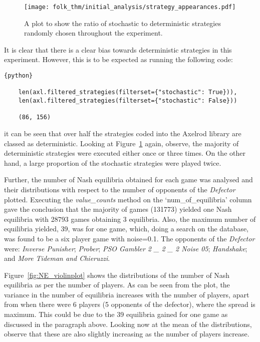 \begin{figure}
    \centering
    \texttt{[image: folk\_thm/initial\_analysis/strategy\_appearances.pdf]}
    \caption{A plot to show the ratio of stochastic to deterministic strategies randomly chosen throughout the experiment.}\label{fig:stochastic_chart}
\end{figure}

It is clear that there is a clear bias towards deterministic strategies
in this experiment. However, this is to be expected as running the following
code:
\begin{verbatim}{python}
    
    len(axl.filtered_strategies(filterset={"stochastic": True})), 
    len(axl.filtered_strategies(filterset={"stochastic": False}))

    (86, 156)
\end{verbatim}
it can be seen that over half the strategies coded into the Axelrod library are
classed as deterministic. Looking at Figure~\ref{fig:stochastic_chart} again,
observe, the majority of deterministic strategies were executed either once or
three times. On the other hand, a large proportion of the stochastic strategies
were played twice.

Further, the number of Nash equilibria obtained for each game was analysed and
their distributions with respect to the number of opponents of the
\textit{Defector} plotted. Executing the \textit{value_counts} method on the
`num_of_equilibria' column gave the conclusion that the majority of games
(131773) yielded one Nash equilibria with 28793 games obtaining 3 equilibria.
Also, the maximum number of equilibria yielded, 39, was for one game, which,
doing a search on the database, was found to be a six player game with
noise=0.1. The opponents of the \textit{Defector} were: \textit{Inverse
Punisher}; \textit{Prober}; \textit{PSO Gambler 2 _ 2 _ 2 Noise 05};
\textit{Handshake}; and \textit{More Tideman and Chieruzzi}.

Figure~\ref{fig:NE_violinplot} shows the distributions of the number of Nash
equilibria as per the number of players. As can be seen from the plot, the
variance in the number of equilibria increases with the number of players, apart
from when there were 6 players (5 opponents of the defector), where the spread
is maximum. This could be due to the 39 equilibria gained for one game as
discussed in the paragraph above. Looking now at the mean of the distributions,
observe that these are also slightly increasing as the number of players
increase. 

